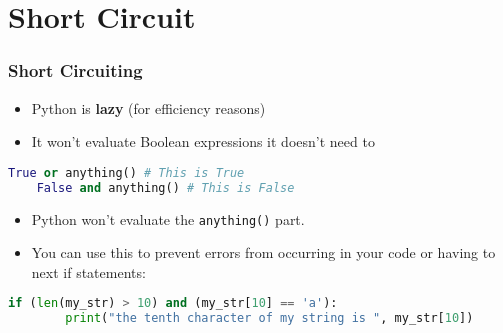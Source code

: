 \documentclass{beamer}
\begin{document}
%
%
\section{Short Circuit}
\begin{frame}[fragile]
	\frametitle{Short Circuiting}
	\begin{itemize}
		\item Python is \textbf{lazy} (for efficiency reasons)
		\item It won't evaluate Boolean expressions it doesn't need to
	\end{itemize}
	\vfill
	\begin{lstlisting}[language=Python, autogobble]
	True or anything() # This is True 
	False and anything() # This is False
	\end{lstlisting}
	\vfill
	\begin{itemize}
		\item Python won't evaluate the \lstinline|anything()| part.
		\item You can use this to prevent errors from occurring in your code or having to next if statements:
	\end{itemize}
	\vfill
	\begin{lstlisting}[language=Python, autogobble]
	if (len(my_str) > 10) and (my_str[10] == 'a'):
		print("the tenth character of my string is ", my_str[10])
	\end{lstlisting}
	\vfill
\end{frame}
\end{document}
